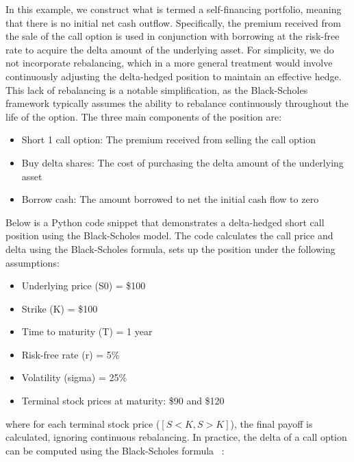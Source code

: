     In this example, we construct what is termed a self-financing portfolio, meaning that there is
    no initial net cash outflow. Specifically, the premium received from the sale of the call option
    is used in conjunction with borrowing at the risk-free rate to acquire the delta amount of the
    underlying asset. For simplicity, we do not incorporate rebalancing, which in a more general
    treatment would involve continuously adjusting the delta-hedged position to maintain an effective hedge.
    This lack of rebalancing is a notable simplification, as the Black-Scholes framework typically assumes
    the ability to rebalance continuously throughout the life of the option.
    The three main components of the position are:

    \begin{itemize}
        \item Short 1 call option: The premium received from selling the call option
        \item Buy delta shares: The cost of purchasing the delta amount of the underlying asset
        \item Borrow cash: The amount borrowed to net the initial cash flow to zero
        \label{eq:position_components}
    \end{itemize}

    Below is a Python code snippet that demonstrates a delta-hedged short call position using the Black-Scholes model.
    The code calculates the call price and delta using the Black-Scholes formula, sets up the position under the
    following assumptions:

    \begin{itemize}
        \item Underlying price (S0) = \$100
        \item Strike (K) = \$100
        \item Time to maturity (T) = 1 year
        \item Risk-free rate (r) = 5\%
        \item Volatility (sigma) = 25\%
        \item Terminal stock prices at maturity: \$90 and \$120
        \label{eq:position_setup}
    \end{itemize}

    where for each terminal stock price ($[S < K ,S > K]$), the final payoff is calculated,
    ignoring continuous rebalancing.
    In practice, the delta of a call option can be computed using the Black-Scholes formula
    ~\cite{luenberger_investment_2014}:

